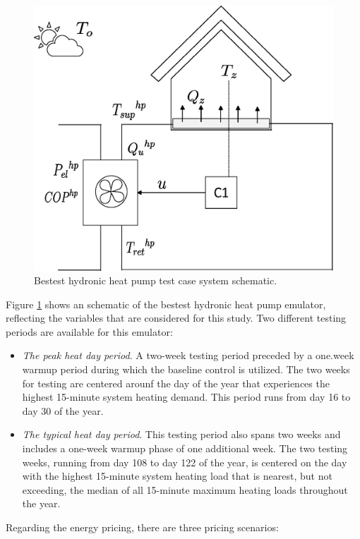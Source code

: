 \begin{figure}
  \centering
  \includegraphics[scale=.4]{images/boptest/Fig1.eps}
\caption{Bestest hydronic heat pump test case system schematic.}
\label{fig:bestest-heatpump}       %
\end{figure}
%
Figure \ref{fig:bestest-heatpump} shows an schematic of the bestest hydronic heat pump emulator, reflecting the variables that are considered for this study.
Two different testing periods are available for this emulator:
\begin{itemize}
    \item \emph{The peak heat day period}. A two-week testing period preceded by a one.week warmup period during which the baseline control is utilized. The two weeks for testing are centered arounf the day of the year that experiences the highest 15-minute system heating demand. This period runs from day 16 to day 30 of the year.
    \item \emph{The typical heat day period}. This testing period also spans two weeks and includes a one-week warmup phase of one additional week. The two testing weeks, running from day 108 to day 122 of the year, is centered on the day with the highest 15-minute system heating load that is nearest, but not exceeding, the median of all 15-minute maximum heating loads throughout the year.
\end{itemize}
Regarding the energy pricing, there are three pricing scenarios: 
